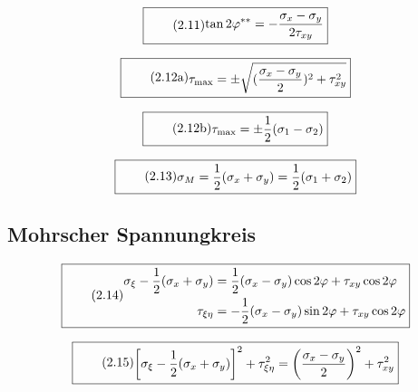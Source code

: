 \documentclass[11pt]{article}
\newcommand{\1}{ {\mathds{1}} }
\begin{document}
		\begin{equation}
			\boxed{
				\tag{2.11}
				\begin{split}
					\tan 2\varphi^{\ast\ast}
					=
					-\frac{\sigma_x - \sigma_y}{2 \tau_{xy}}
				\end{split}
			}
		\end{equation}

		\begin{equation}
			\boxed{
				\tag{2.12a}
				\begin{split}
					\tau_{\text{max}}
					=
					\pm
					\sqrt{(\frac{\sigma_x - \sigma_y}{2})^2 + \tau_{xy}^2}
				\end{split}
			}
		\end{equation}

		\begin{equation}
			\boxed{
				\tag{2.12b}
				\begin{split}
					\tau_{\text{max}}
					=
					\pm
					\frac{1}{2}(\sigma_1 -\sigma_2)
				\end{split}
			}
		\end{equation}

		\begin{equation}
			\boxed{
				\tag{2.13}
				\begin{split}
					\sigma_M
					=
					\frac{1}{2}(\sigma_x + \sigma_y)
					=
					\frac{1}{2}(\sigma_1 + \sigma_2)
				\end{split}
			}
		\end{equation}

		\subsection{Mohrscher Spannungkreis}

		\begin{equation}
			\boxed{
				\tag{2.14}
				\begin{split}
					\sigma_\xi-\frac{1}{2}(\sigma_x + \sigma_y)
					&=
					\frac{1}{2}(\sigma_x -\sigma_y)\cos 2\varphi + \tau_{xy}\cos 2 \varphi\\
					\tau_{\xi\eta}
					&=
					- \frac{1}{2}(\sigma_x - \sigma_y) \sin 2 \varphi + \tau_{xy} \cos 2\varphi
				\end{split}
			}
		\end{equation}		

		\begin{equation}
			\boxed{
				\tag{2.15}
				\begin{split}
					\left[\sigma_\xi - \frac{1}{2} (\sigma_x + \sigma_y)\right]^2
					+
					\tau_{\xi \eta}^2
					=
					\left(
						\frac{\sigma_x - \sigma_y}{2}
					\right)^2
					+
					\tau_{xy}^2
				\end{split}
			}
		\end{equation}		
\end{document}
